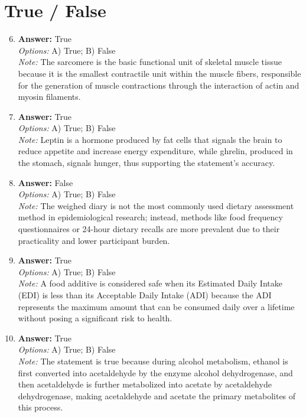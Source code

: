 \documentclass[12pt]{article}
\begin{document}
\section*{True / False}
\begin{enumerate}[label=\arabic*.]
\setcounter{enumi}{5}
\item \textbf{Answer:} True
\\ \textit{Options:} A) True; B) False
\\ \textit{Note:} The sarcomere is the basic functional unit of skeletal muscle tissue because it is the smallest contractile unit within the muscle fibers, responsible for the generation of muscle contractions through the interaction of actin and myosin filaments.
\item \textbf{Answer:} True
\\ \textit{Options:} A) True; B) False
\\ \textit{Note:} Leptin is a hormone produced by fat cells that signals the brain to reduce appetite and increase energy expenditure, while ghrelin, produced in the stomach, signals hunger, thus supporting the statement's accuracy.
\item \textbf{Answer:} False
\\ \textit{Options:} A) True; B) False
\\ \textit{Note:} The weighed diary is not the most commonly used dietary assessment method in epidemiological research; instead, methods like food frequency questionnaires or 24-hour dietary recalls are more prevalent due to their practicality and lower participant burden.
\item \textbf{Answer:} True
\\ \textit{Options:} A) True; B) False
\\ \textit{Note:} A food additive is considered safe when its Estimated Daily Intake (EDI) is less than its Acceptable Daily Intake (ADI) because the ADI represents the maximum amount that can be consumed daily over a lifetime without posing a significant risk to health.
\item \textbf{Answer:} True
\\ \textit{Options:} A) True; B) False
\\ \textit{Note:} The statement is true because during alcohol metabolism, ethanol is first converted into acetaldehyde by the enzyme alcohol dehydrogenase, and then acetaldehyde is further metabolized into acetate by acetaldehyde dehydrogenase, making acetaldehyde and acetate the primary metabolites of this process.
\end{enumerate}
\end{document}
